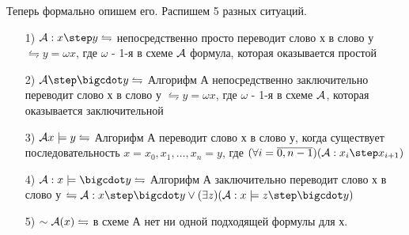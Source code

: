 \medskip

Теперь формально опишем его.
Распишем 5 разных ситуаций.

\begin{itemize}
    \item[1)] $ {\cal A}: x\step y \leftrightharpoons$
        непосредственно просто переводит
        слово х в слово у $\leftrightharpoons y = \omega x$, где $\omega$ - 1-я в схеме  $ {\cal A}$ 
        формула, которая оказывается простой
    \item[2)] $ {\cal A} \step\bigcdot y \leftrightharpoons$
        Алгорифм А непосредственно заключительно переводит
        слово х в слово у $\leftrightharpoons y = \omega x$, где $\omega$ - 1-я в схеме
         $ {\cal A}$, которая оказывается заключительной
     \item[3)] $ {\cal A} x\models y \leftrightharpoons$
         Алгорифм А переводит слово х в слово у, когда
         существует последовательность $x=x_0,x_1,\ldots,x_{n}=y$, где
         $(\forall i=\overline{0,n-1})( {\cal A}:x_{i}\step x_{i+1})$ 
     \item[4)] $ {\cal A}:x \models\bigcdot y \leftrightharpoons$
         Алгорифм А заключительно переводит слово х в слово у
         $\leftrightharpoons {\cal A}: x\step\bigcdot y \lor
         (\exists z)( {\cal A}:x \models z\step\bigcdot y )$ 
     \item[5)] $\sim {\cal A}(x) \leftrightharpoons$ в схеме А нет ни одной подходящей формулы для х.
\end{itemize}
